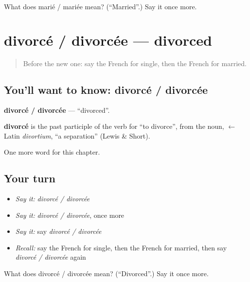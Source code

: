 \begin{tcolorbox}[breakable,colback=teal!4,colframe=teal!35!black,title={Before you move on}]
What does marié / mariée mean? (\textquotedblleft{}Married\textquotedblright{}.) Say it once more.
\end{tcolorbox}
\section[divorcé / divorcée]{divorcé / divorcée — divorced}

\label{lesson:FR-C162-divorce-divorcee}



\begin{quote}
Before the new one: say the French for single, then the French for married.
\end{quote}

\subsection*{You'll want to know: divorcé / divorcée}
\textbf{divorcé / divorcée} — \textquotedblleft{}divorced\textquotedblright{}.

\begin{cousinweb}
\textbf{divorcé} is the past participle of the verb for \textquotedblleft{}to divorce\textquotedblright{}, from the noun, $\leftarrow$ Latin \emph{divortium}, \textquotedblleft{}a separation\textquotedblright{} (Lewis \& Short).
\end{cousinweb}

\begin{grammarlens}[title={What you've built}]
One more word for this chapter.
\end{grammarlens}

\subsection*{Your turn}
\begin{itemize}
\raggedright
  \item \emph{Say it:} \emph{divorcé / divorcée}
  \item \emph{Say it:} \emph{divorcé / divorcée}, once more
  \item \emph{Say it:} say \emph{divorcé / divorcée}
  \item \emph{Recall:} say the French for single, then the French for married, then say \emph{divorcé / divorcée} again
\end{itemize}

\begin{tcolorbox}[breakable,colback=teal!4,colframe=teal!35!black,title={Before you move on}]
What does divorcé / divorcée mean? (\textquotedblleft{}Divorced\textquotedblright{}.) Say it once more.
\end{tcolorbox}
